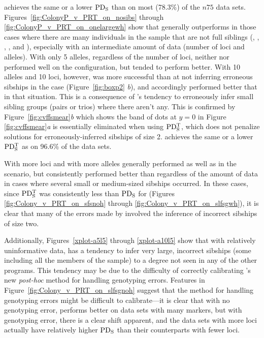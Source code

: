 \documentclass[11pt]{article}
\begin{document}
{%
\colony{} achieves the same or a lower $\mathrm{PD_S}$ than \prt{} on most (78.3\%) of the $n75$ data sets.  
Figures~\ref{fig:ColonyP_v_PRT_on_nosibs} through \ref{fig:ColonyP_v_PRT_on_onelargewh} show that 
\prt{} generally outperforms \colony{} in those cases where there are many individuals in the sample 
that are not full siblings (\nosibs, \allhalf, \allpathalf, \onelargenoh, and \onelargewh), especially 
with an intermediate amount of data (number of loci and alleles). With only 5 alleles, regardless of 
the number of loci, neither \colony{} nor \prt{} performed well on the \nosibs{} configuration, but 
\colony{} tended to perform better.  With 10 alleles and 10 loci, however, \prt{} was more successful 
than \colony{} at not inferring erroneous sibships in the \nosibs{} case (Figure~\ref{fig:boxp2}{\em 
b}), and accordingly performed better that \colony{} in that situation.   This is a consequence of 
\colony{}'s tendency to erroneously infer small sibling groups (pairs or trios) where there aren't any.  
This is confirmed by Figure~\ref{fig:cvffsmear}{\em b} which shows the band of dots at $y=0$ in Figure~
\ref{fig:cvffsmear}{\em a} is essentially eliminated when using $\mathrm{PD_S^T}$, which does not penalize 
solutions for erroneously-inferred sibships of size 2. \colony{} achieves the same or a lower $\mathrm{PD_S^T}$ 
as \prt{} on 96.6\% of the data sets.   

With more loci and with more alleles \colony{} generally performed as well as \prt{} in the \nosibs{} 
scenario, but consistently performed better than \prt{} regardless of the amount of data in cases where 
several small or medium-sized sibships occurred.  In these cases, since $\mathrm{PD_S^T}$ was consistently less 
than $\mathrm{PD_S}$ for \prt{} (Figures \ref{fig:Colony_v_PRT_on_sfsnoh} through 
\ref{fig:Colony_v_PRT_on_slfsgwh}), it is clear that many of the errors made by \prt{} involved the 
inference of incorrect sibships of size two. 

Additionally, Figures~\ref{xplot-a5l5} through \ref{xplot-a10l5} show that with relatively 
uninformative data, \prt{} has a tendency to infer very large, incorrect sibships (some including all 
the members of the sample) to a degree not seen in any of the other programs. This tendency may be due 
to the difficulty of correctly calibrating \prt{}'s new {\em post-hoc} method for handling genotyping 
errors.  Features in Figure~\ref{fig:Colony_v_PRT_on_slfsgnoh} suggest that the method for handling 
genotyping errors might be difficult to calibrate---it is clear that with no genotyping error, \prt{} 
performs better on data sets with many markers, but with genotyping error, there is a clear shift 
apparent, and the data sets with more loci actually  have relatively higher $\mathrm{PD_S}$ than their 
counterparts with fewer loci. 




}
\end{document}
